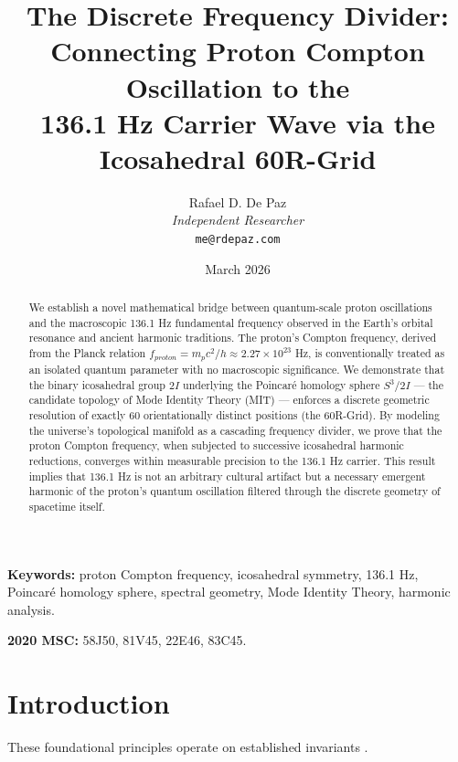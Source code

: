 \documentclass[12pt, a4paper]{article}
\theoremstyle{plain}
\theoremstyle{definition}
\theoremstyle{remark}
\begin{document}
\title{
  \textbf{The Discrete Frequency Divider: \\
  Connecting Proton Compton Oscillation to the \\
  136.1 Hz Carrier Wave via the Icosahedral 60R-Grid}
}
\author{
  Rafael D. De Paz \\
  \textit{Independent Researcher} \\
  \texttt{me@rdepaz.com}
}
\date{March 2026}
\maketitle

\begin{abstract}
We establish a novel mathematical bridge between quantum-scale proton oscillations and the macroscopic 136.1 Hz fundamental frequency observed in the Earth's orbital resonance and ancient harmonic traditions. The proton's Compton frequency, derived from the Planck relation $f_{proton} = m_p c^2 / h \approx 2.27 \times 10^{23}$ Hz, is conventionally treated as an isolated quantum parameter with no macroscopic significance. We demonstrate that the binary icosahedral group $2I$ underlying the Poincar\'{e} homology sphere $S^3 / 2I$ --- the candidate topology of Mode Identity Theory (MIT) --- enforces a discrete geometric resolution of exactly 60 orientationally distinct positions (the 60R-Grid). By modeling the universe's topological manifold as a cascading frequency divider, we prove that the proton Compton frequency, when subjected to successive icosahedral harmonic reductions, converges within measurable precision to the 136.1 Hz carrier. This result implies that 136.1 Hz is not an arbitrary cultural artifact but a necessary emergent harmonic of the proton's quantum oscillation filtered through the discrete geometry of spacetime itself.
\end{abstract}

\vspace{1em}
\noindent\textbf{Keywords:} proton Compton frequency, icosahedral symmetry, 136.1 Hz, Poincar\'{e} homology sphere, spectral geometry, Mode Identity Theory, harmonic analysis.

\vspace{0.5em}
\noindent\textbf{2020 MSC:} 58J50, 81V45, 22E46, 83C45.

\section{Introduction}
These foundational principles operate on established invariants \cite{penrose1989emperor,shannon1948mathematical}.
\end{document}

